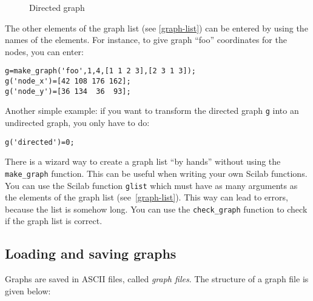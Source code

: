 \documentclass[11pt]{article}
\newcommand{\func}[1]{\texttt{#1}}
\begin{document}
\begin{figure}
  \centerline{}
  \caption{Directed graph}
  \label{fig-foo1}
\end{figure}

The other elements of the graph list (see \ref{graph-list}) can be
entered by using the names of the elements. For instance, to give graph
``foo'' coordinates for the nodes, you can enter:
\begin{verbatim}
g=make_graph('foo',1,4,[1 1 2 3],[2 3 1 3]);
g('node_x')=[42 108 176 162];
g('node_y')=[36 134  36  93];
\end{verbatim}

Another simple example: if you want to transform the directed graph \texttt{g}
into
an undirected graph, you only have to do:
\begin{verbatim}
g('directed')=0;
\end{verbatim}

There is a wizard way to create a graph list ``by hands''
without using the 
\func{make\_graph} function. This can be useful when writing your
own Scilab functions.
You can use the Scilab function
\func{glist} which must have as many arguments as the elements of
the graph list (see~\ref{graph-list}).
This way can lead
to errors, because the list is somehow long. You can use the 
\func{check\_graph}
function to check if the graph list is correct.

\subsection{Loading and saving graphs}\label{loading}

Graphs are saved in ASCII files, called \emph{graph files}. The
structure of a graph file is given below:
\end{document}
